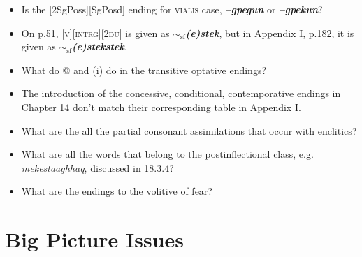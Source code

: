 \documentclass{article}
\begin{document}
\begin{itemize}

\item Is the [2SgPoss][SgPosd] ending for \textsc{vialis} case, \textit{\textbf{--gpegun}} or \textit{\textbf{--gpekun}}?

\item On p.51, \textsc{[v][intrg][2du]} is given as \textit{\textbf{$\sim_\text{sf}$(e)stek}}, but in Appendix I, p.182, it is given as \textit{\textbf{$\sim_\text{sf}$(e)stekstek}}.

\item What do @ and (i) do in the transitive optative endings?

\item The introduction of the concessive, conditional, contemporative endings in Chapter 14 don't match their corresponding table in Appendix I.

\item What are the all the partial consonant assimilations that occur with enclitics?

\item What are all the words that belong to the postinflectional class, e.g. \textit{mekestaaghhaq}, discussed in 18.3.4?

\item What are the endings to the volitive of fear?

\end{itemize}


\section{Big Picture Issues}
\end{document}
